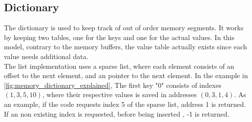 \subsection{Dictionary} \label{subsec:dictionary}
The dictionary is used to keep track of out of order memory segments.
It works by keeping two tables, one for the keys and one for the actual values.
In this model, contrary to the memory buffers, the value table actually exists
since each value needs additional data. \\
The list implementation uses a sparse list, where each element consists of an
offset to the next element, and an pointer to the next element. In the example in
\autoref{fig:memory_dictionary_explained}, The first key "0" consists of indexes
$(1,3,5,10)$, where their respective values is saved in
addresses $(0,3,1,4)$. As an example,
if the code requests index 5 of the sparse list, address 1 is returned. If an
non existing index is requested, before being inserted , -1 is returned.
